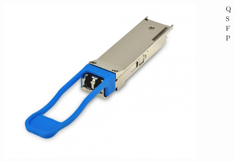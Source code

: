 \documentclass[
    ngerman,
    accentcolor=3b,
    fontsize= 12pt,
    a4paper,
    aspectratio=169,
    colorback=true,
    fancy_row_colors,
    leqno,
    fleqn,
    boxarc=3pt,
    fleqn,
    main,
    design=2008,
]{algoslides}
\begin{document}
    \begin{frame}
        \slidehead{}
        \vspace{-1em}
        \begin{columns}[c]
            \begin{column}{.5\textwidth}
                \begin{figure}[ht!]
                    \centering
                    \includegraphics[height=.6\textheight]{qsfp-transciever}
                    \label{fig:qsfp-transciever}
                \end{figure}
            \end{column}
            \pause
            \begin{column}{.5\textwidth}
                \large
                \centering
                QSFP
            \end{column}
        \end{columns}
    \end{frame}
\end{document}
